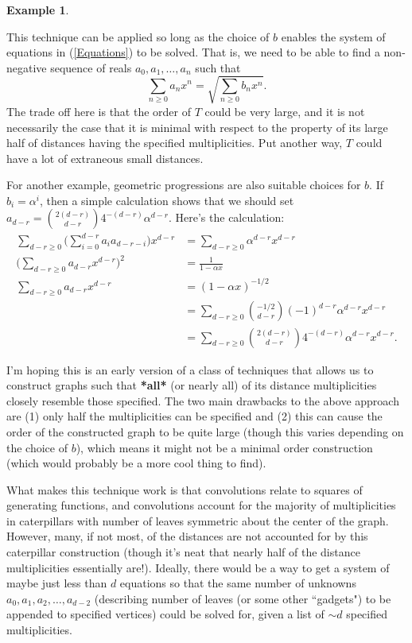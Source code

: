 \documentclass[12]{article}
\theoremstyle{definition}
\newtheorem{eg}{Example}
\begin{document}
\begin{eg}
		
		
		\end{eg}
		
		This technique can be applied so long as the choice of $b$ enables the system of equations in (\ref{Equations}) to be solved.  That is, we need to be able to find a non-negative sequence of reals $a_0, a_1, \ldots, a_n$ such that 
		$$\sum_{n \geq 0}a_nx^n = \sqrt{\sum_{n \geq 0}b_nx^n}.$$
		The trade off here is that the order of $T$ could be very large, and it is not necessarily the case that it is minimal with respect to the property of its large half of distances having the specified multiplicities.  Put another way, $T$ could have a lot of extraneous small distances.
		
		For another example, geometric progressions are also suitable choices for $b$. If $b_i = \alpha^{i}$, then a simple calculation shows that we should set $a_{d-r} = {2(d-r) \choose d-r} 4^{-(d-r)} \alpha^{d-r}$.  Here's the calculation:
		\begin{align*}
			\sum_{d-r \geq 0} \biggr(\sum_{i=0}^{d-r} a_ia_{d-r-i}\biggr)x^{d-r} &= \sum_{d-r \geq 0} \alpha^{d-r}x^{d-r}	\\
			\biggr(\sum_{d-r \geq 0} a_{d-r}x^{d-r} \biggr)^2 &= \frac{1}{1-\alpha x}	\\
			\sum_{d-r \geq 0} a_{d-r}x^{d-r} &= (1-\alpha x)^{-1/2}	\\
			&= \sum_{d-r \geq 0} {-1/2 \choose d-r}(-1)^{d-r} \alpha^{d-r}x^{d-r}	\\
			&= \sum_{d-r \geq 0}  {2(d-r) \choose d-r} 4^{-(d-r)} \alpha^{d-r}x^{d-r}.
		\end{align*}
	
	I'm hoping this is an early version of a class of techniques that allows us to construct graphs such that \textbf{*all*} (or nearly all) of its distance multiplicities closely resemble those specified.  The two main drawbacks to the above approach are (1) only half the multiplicities can be specified and (2) this can cause the order of the constructed graph to be quite large (though this varies depending on the choice of $b$), which means it might not be a minimal order construction (which would probably be a more cool thing to find).  
	
	What makes this technique work is that convolutions relate to squares of generating functions, and convolutions account for the majority of multiplicities in caterpillars with number of leaves symmetric about the center of the graph.   However, many, if not most, of the distances are not accounted for by this caterpillar construction (though it's neat that nearly half of the distance multiplicities essentially are!).  Ideally, there would be a way to get a system of maybe just less than $d$ equations so that the same number of unknowns $a_0, a_1, a_2, \ldots, a_{d-2}$ (describing number of leaves (or some other ``gadgets") to be appended to specified vertices) could be solved for, given a list of $\sim d$ specified multiplicities.  
	
\end{document}
